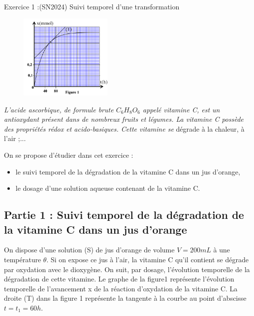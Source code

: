 \documentclass[12pt, french]{article}
\begin{document}
\begin{center}
\end{center}

\vspace{-0.2cm}
   \begin{Box2}{Exercice 1 :(SN2024)  Suivi temporel d’une transformation}
     \begin{figure}
  \begin{center}
	  \vspace{-0.6cm}
	\includegraphics[width=0.4\textwidth]{./img/suivi_01.png}
  \end{center}
\end{figure}

     \emph{
L'acide ascorbique, de formule brute $C_6H_8O_6$
appelé vitamine C, est un antioxydant présent dans de
nombreux fruits et légumes. La vitamine C possède des propriétés rédox et
     acido-basiques. Cette vitamine se }dégrade à la chaleur, à l’air ;... 

On se propose d’étudier dans cet exercice :
\begin{itemize}
  \item le suivi temporel de la dégradation de la vitamine C dans un jus d'orange,
  \item le dosage d’une solution aqueuse contenant de la vitamine C.
\end{itemize}
     \subsection*{Partie 1 : Suivi temporel de la dégradation de la vitamine C dans un jus d'orange}
On dispose d’une solution (S) de jus d'orange de volume $V=200mL$ à une température $\theta$. Si on expose ce
jus à l’air, la vitamine C qu’il contient se dégrade par oxydation avec le dioxygène.
On suit, par dosage, l’évolution temporelle de la dégradation de cette vitamine. Le graphe de la figure1
représente l’évolution temporelle de l’avancement x de la réaction d’oxydation de la vitamine C. La droite
(T) dans la figure 1 représente la tangente à la courbe au point d’abscisse $t = t_1 = 60h$.


\end{Box2}
\end{document}
